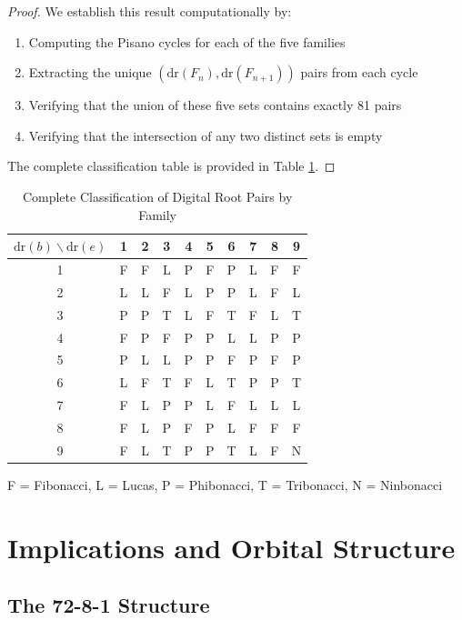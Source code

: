 \documentclass[12pt]{article}
\begin{document}
\begin{proof}
We establish this result computationally by:
\begin{enumerate}
\item Computing the Pisano cycles for each of the five families
\item Extracting the unique $(\text{dr}(F_n), \text{dr}(F_{n+1}))$ pairs from each cycle
\item Verifying that the union of these five sets contains exactly 81 pairs
\item Verifying that the intersection of any two distinct sets is empty
\end{enumerate}

The complete classification table is provided in Table \ref{tab:classification}.
\end{proof}

\begin{table}[h!]
\centering
\caption{Complete Classification of Digital Root Pairs by Family}
\label{tab:classification}
\small
\begin{tabular}{c|ccccccccc}
\toprule
$\text{dr}(b) \backslash \text{dr}(e)$ & 1 & 2 & 3 & 4 & 5 & 6 & 7 & 8 & 9 \\
\midrule
1 & F & F & L & P & F & P & L & F & F \\
2 & L & L & F & L & P & P & L & F & L \\
3 & P & P & T & L & F & T & F & L & T \\
4 & F & P & F & P & P & L & L & P & P \\
5 & P & L & L & P & P & F & P & F & P \\
6 & L & F & T & F & L & T & P & P & T \\
7 & F & L & P & P & L & F & L & L & L \\
8 & F & L & P & F & P & L & F & F & F \\
9 & F & L & T & P & P & T & L & F & N \\
\bottomrule
\end{tabular}

\vspace{0.2cm}
\small{F = Fibonacci, L = Lucas, P = Phibonacci, T = Tribonacci, N = Ninbonacci}
\end{table}

\section{Implications and Orbital Structure}

\subsection{The 72-8-1 Structure}
\end{document}
